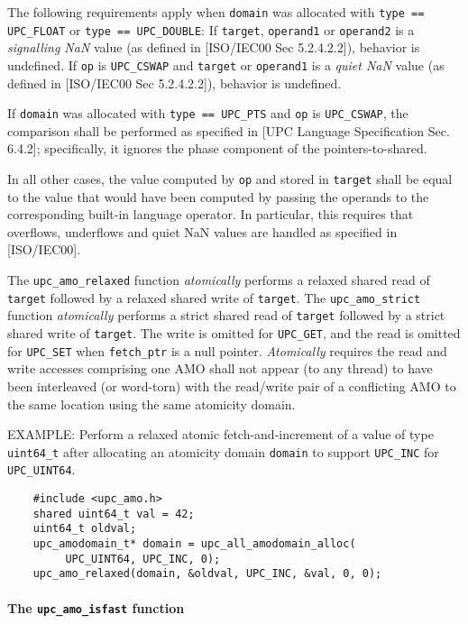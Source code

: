 \np The following requirements apply when {\tt domain} was allocated 
    with {\tt type == UPC\_FLOAT} or {\tt type == UPC\_DOUBLE}:
    If {\tt *target}, {\tt *operand1} or {\tt *operand2} is a {\em signalling NaN} value 
    (as defined in [ISO/IEC00 Sec 5.2.4.2.2]), behavior is undefined.
    If {\tt op} is {\tt UPC\_CSWAP} and {\tt *target} or {\tt *operand1} is a {\em quiet NaN} value 
    (as defined in [ISO/IEC00 Sec 5.2.4.2.2]), behavior is undefined.

\np If {\tt domain} was allocated with {\tt type == UPC\_PTS} and {\tt op} is {\tt UPC\_CSWAP},
    the comparison shall be performed as specified in [UPC Language Specification Sec. 6.4.2];
    specifically, it ignores the phase component of the pointers-to-shared.

\np In all other cases, the value computed by {\tt op} and stored in {\tt *target} 
    shall be equal to the value that would have been computed by passing the operands 
    to the corresponding built-in language operator. In particular, this requires that
    overflows, underflows and quiet NaN values are handled as specified in [ISO/IEC00].

\np The {\tt upc\_amo\_relaxed} function {\em atomically} performs a relaxed shared read of {\tt *target} 
    followed by a relaxed shared write of {\tt *target}. 
    The {\tt upc\_amo\_strict} function {\em atomically} performs a strict shared read of {\tt *target} 
    followed by a strict shared write of {\tt *target}. The write is omitted for {\tt UPC\_GET}, 
    and the read is omitted for {\tt UPC\_SET} when {\tt fetch\_ptr} is a null pointer.
    {\em Atomically} requires the read and write accesses comprising one AMO shall not appear (to any thread) 
    to have been interleaved (or word-torn) with the read/write pair of a conflicting AMO to the same location
    using the same atomicity domain.

\np EXAMPLE: Perform a relaxed atomic fetch-and-increment of a value of type
    {\tt uint64\_t} after allocating an atomicity domain {\tt domain} to
    support {\tt UPC\_INC} for {\tt UPC\_UINT64}.
\begin{verbatim}
    #include <upc_amo.h>
    shared uint64_t val = 42;
    uint64_t oldval;
    upc_amodomain_t* domain = upc_all_amodomain_alloc(
         UPC_UINT64, UPC_INC, 0);
    upc_amo_relaxed(domain, &oldval, UPC_INC, &val, 0, 0);
\end{verbatim}
\vfill

\paragraph{The {\tt upc\_amo\_isfast} function}


